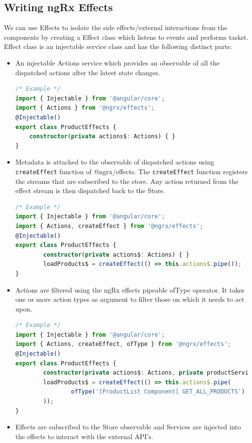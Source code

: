 \documentclass{report}
\begin{document}
\subsection{Writing ngRx Effects}
We can use Effects to isolate the side effects/external interactions from the components by creating a Effect class which listens to events and performs taskst.
Effect class is an injectable service class and has the following distinct parts:
\begin{itemize}
	\item{An injectable Actions service which provides an observable of all the dispatched actions after the latest state changes.}
		\begin{lstlisting}[language=Typescript, caption=product-effects.ts]
		/* Example */
import { Injectable } from '@angular/core';
import { Actions } from '@ngrx/effects';
@Injectable()
export class ProductEffects {
	constructor(private actions$: Actions) { }
}
	\end{lstlisting}
\item{Metadata is attached to the observable of dispatched actions using \lstinline{createEffect} function of @ngrx/effects. The \lstinline{createEffect} function registers the streams that are subscribed to the store. Any action returned from the effect stream is then dispatched back to the Store.}
		\begin{lstlisting}[language=Typescript, caption=product-effects.ts]
		/* Example */
import { Injectable } from '@angular/core';
import { Actions, createEffect } from '@ngrx/effects';
@Injectable()
export class ProductEffects {
		constructor(private actions$: Actions) { }
		loadProducts$ = createEffect(() => this.actions$.pipe());
}
\end{lstlisting}
\item{Actions are filtered using the ngRx effects pipeable ofType operator. It takes one or more action types as argument to filter those on which it needs to act upon.}
		\begin{lstlisting}[language=Typescript, caption=product-effects.ts]
		/* Example */
import { Injectable } from '@angular/core';
import { Actions, createEffect, ofType } from '@ngrx/effects';
@Injectable()
export class ProductEffects {
		constructor(private actions$: Actions, private productService: ProductService) { }
		loadProducts$ = createEffect(() => this.actions$.pipe(
				ofType('[ProductList Component] GET_ALL_PRODUCTS')
		));
}
\end{lstlisting}
\item{Effects are subscribed to the Store observable and Services are injected into the effects to interact with the external API's.}

\end{itemize}
\end{document}

